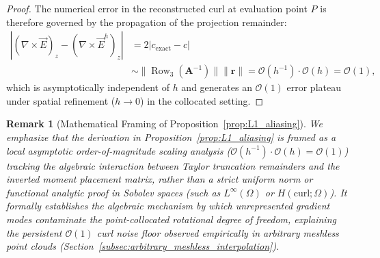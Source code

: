 \documentclass[preprint,12pt]{elsarticle}
\newtheorem{remark}{Remark}
\begin{document}
\begin{proof}
The numerical error in the reconstructed curl at evaluation point $P$ is therefore governed by the propagation of the projection remainder:
\begin{equation}
\begin{aligned}
|(\nabla \times \vec{E})_z - (\nabla \times \vec{E}^h)_z| &= 2 |c_{\mathrm{exact}} - c| \\
&\sim \|\operatorname{Row}_3(\mathbf{A}^{-1})\| \|\mathbf{r}\| = \mathcal{O}(h^{-1}) \cdot \mathcal{O}(h) = \mathcal{O}(1),
\end{aligned}
\end{equation}
which is asymptotically independent of $h$ and generates an $\mathcal{O}(1)$ error plateau under spatial refinement ($h \to 0$) in the collocated setting.
\end{proof}

\begin{remark}[Mathematical Framing of Proposition~\ref{prop:L1_aliasing}]
We emphasize that the derivation in Proposition~\ref{prop:L1_aliasing} is framed as a local asymptotic order-of-magnitude scaling analysis ($\mathcal{O}(h^{-1}) \cdot \mathcal{O}(h) = \mathcal{O}(1)$) tracking the algebraic interaction between Taylor truncation remainders and the inverted moment placement matrix, rather than a strict uniform norm or functional analytic proof in Sobolev spaces (such as $L^\infty(\Omega)$ or $H(\mathrm{curl}; \Omega)$). It formally establishes the algebraic mechanism by which unrepresented gradient modes contaminate the point-collocated rotational degree of freedom, explaining the persistent $\mathcal{O}(1)$ curl noise floor observed empirically in arbitrary meshless point clouds (Section~\ref{subsec:arbitrary_meshless_interpolation}).
\end{remark}

\begin{table}[!htbp]
\centering
\caption{Comparison of polynomial completeness, dimensionality, and derivative reproduction capabilities between the incomplete solenoidal space $\mathcal{L}^1$ and the complete linear vector polynomial space $\mathcal{P}^1$.}
\label{tab:basis_completeness_comparison}
\end{table}
\end{document}
